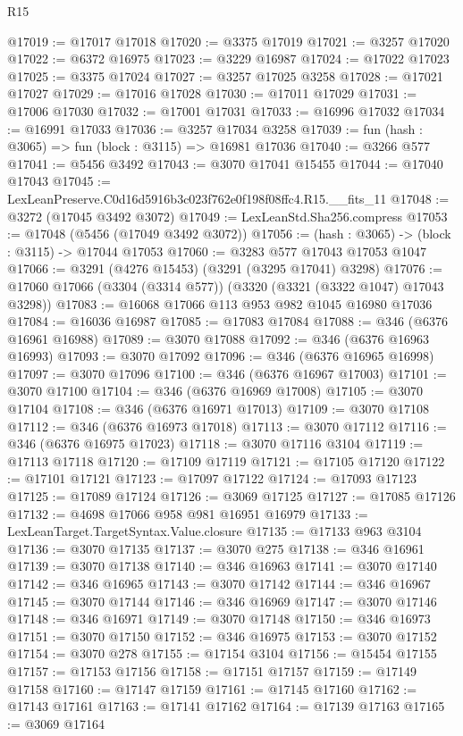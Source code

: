 \begin{lexlean}{R15}
\begin{coremodule}
@17019 := @17017 @17018
@17020 := @3375 @17019
@17021 := @3257 @17020
@17022 := @6372 @16975
@17023 := @3229 @16987
@17024 := @17022 @17023
@17025 := @3375 @17024
@17027 := @3257 @17025 @3258
@17028 := @17021 @17027
@17029 := @17016 @17028
@17030 := @17011 @17029
@17031 := @17006 @17030
@17032 := @17001 @17031
@17033 := @16996 @17032
@17034 := @16991 @17033
@17036 := @3257 @17034 @3258
@17039 := fun (hash : @3065) => fun (block : @3115) => @16981 @17036
@17040 := @3266 @577
@17041 := @5456 @3492
@17043 := @3070 @17041 @15455
@17044 := @17040 @17043
@17045 := LexLeanPreserve.C0d16d5916b3c023f762e0f198f08ffc4.R15.__fits_11
@17048 := @3272 (@17045 @3492 @3072)
@17049 := LexLeanStd.Sha256.compress
@17053 := @17048 (@5456 (@17049 @3492 @3072))
@17056 := (hash : @3065) -> (block : @3115) -> @17044 @17053
@17060 := @3283 @577 @17043 @17053 @1047
@17066 := @3291 (@4276 @15453) (@3291 (@3295 @17041) @3298)
@17076 := @17060 @17066 (@3304 (@3314 @577)) (@3320 (@3321 (@3322 @1047) @17043 @3298))
@17083 := @16068 @17066 @113 @953 @982 @1045 @16980 @17036
@17084 := @16036 @16987
@17085 := @17083 @17084
@17088 := @346 (@6376 @16961 @16988)
@17089 := @3070 @17088
@17092 := @346 (@6376 @16963 @16993)
@17093 := @3070 @17092
@17096 := @346 (@6376 @16965 @16998)
@17097 := @3070 @17096
@17100 := @346 (@6376 @16967 @17003)
@17101 := @3070 @17100
@17104 := @346 (@6376 @16969 @17008)
@17105 := @3070 @17104
@17108 := @346 (@6376 @16971 @17013)
@17109 := @3070 @17108
@17112 := @346 (@6376 @16973 @17018)
@17113 := @3070 @17112
@17116 := @346 (@6376 @16975 @17023)
@17118 := @3070 @17116 @3104
@17119 := @17113 @17118
@17120 := @17109 @17119
@17121 := @17105 @17120
@17122 := @17101 @17121
@17123 := @17097 @17122
@17124 := @17093 @17123
@17125 := @17089 @17124
@17126 := @3069 @17125
@17127 := @17085 @17126
@17132 := @4698 @17066 @958 @981 @16951 @16979
@17133 := LexLeanTarget.TargetSyntax.Value.closure
@17135 := @17133 @963 @3104
@17136 := @3070 @17135
@17137 := @3070 @275
@17138 := @346 @16961
@17139 := @3070 @17138
@17140 := @346 @16963
@17141 := @3070 @17140
@17142 := @346 @16965
@17143 := @3070 @17142
@17144 := @346 @16967
@17145 := @3070 @17144
@17146 := @346 @16969
@17147 := @3070 @17146
@17148 := @346 @16971
@17149 := @3070 @17148
@17150 := @346 @16973
@17151 := @3070 @17150
@17152 := @346 @16975
@17153 := @3070 @17152
@17154 := @3070 @278
@17155 := @17154 @3104
@17156 := @15454 @17155
@17157 := @17153 @17156
@17158 := @17151 @17157
@17159 := @17149 @17158
@17160 := @17147 @17159
@17161 := @17145 @17160
@17162 := @17143 @17161
@17163 := @17141 @17162
@17164 := @17139 @17163
@17165 := @3069 @17164

\end{coremodule}
\end{lexlean}
